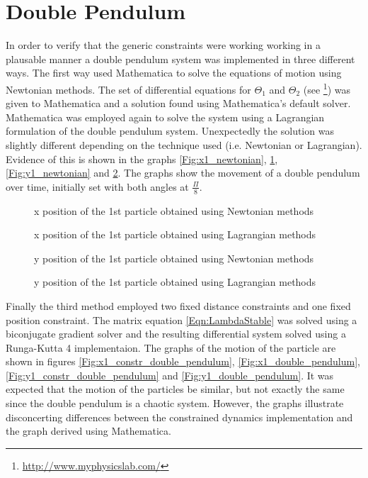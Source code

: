 \section{Double Pendulum}
In order to verify that the generic constraints were working working in a
plausable manner a double pendulum system was implemented in three different
ways. The first way used Mathematica to solve the equations of motion using
Newtonian methods. The set of differential equations for $\Theta_1$ and
$\Theta_2$ (see \footnote{\url{http://www.myphysicslab.com/}}) was given to
Mathematica and a solution found using Mathematica's default solver. Mathematica
was employed again to solve the system using a Lagrangian formulation of the
double pendulum system.  Unexpectedly the solution was slightly different
depending on the technique used (i.e.  Newtonian or Lagrangian). Evidence of
this is shown in the graphs \ref{Fig:x1_newtonian}, \ref{Fig:x1_lagrangian}, 
\ref{Fig:y1_newtonian} and \ref{Fig:y1_lagrangian}. The graphs show the movement of a double
pendulum over time, initially set with both angles at $\frac{\Pi}{8}$.

\begin{figure}
	\begin{center}
	\end{center}
    \caption{\label{Fig:x1_newtonian}x position of the 1st particle obtained using Newtonian methods}
	\begin{center}
	\end{center}
    \caption{\label{Fig:x1_lagrangian}x position of the 1st particle obtained using Lagrangian methods}
\end{figure}

\begin{figure}
	\begin{center}
	\end{center}
    \caption{\label{Fig:y1_newtonian}y position of the 1st particle obtained using Newtonian methods}
	\begin{center}
	\end{center}
    \caption{\label{Fig:y1_lagrangian}y position of the 1st particle obtained using Lagrangian methods}
\end{figure}

Finally the third method employed two fixed distance constraints and one fixed
position constraint. The matrix equation \ref{Eqn:LambdaStable} was solved using
a biconjugate gradient solver \cite{NumRecipes} and the resulting differential
system solved using a Runga-Kutta 4 implementaion. The graphs of the motion of
the particle are shown in figures \ref{Fig:x1_constr_double_pendulum},
\ref{Fig:x1_double_pendulum}, \ref{Fig:y1_constr_double_pendulum} and
\ref{Fig:y1_double_pendulum}.  It was expected that the motion of the particles
be similar, but not exactly the same since the double pendulum is a chaotic
system. However, the graphs illustrate disconcerting differences between the
constrained dynamics implementation and the graph derived using Mathematica.

